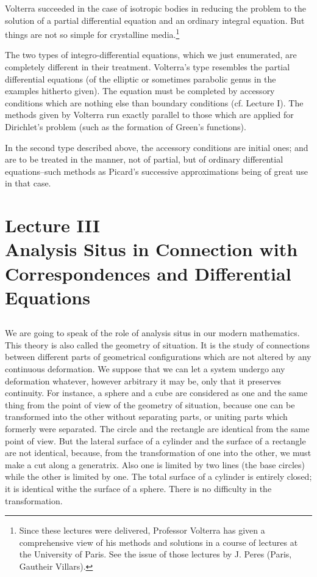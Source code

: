 \documentclass[12pt,oneside]{book}
\begin{document}
Volterra succeeded in the case of isotropic bodies in reducing the problem to
the solution of a partial differential equation and an ordinary integral
equation. But things are not so simple for crystalline media.\footnote{Since
these lectures were delivered, Professor Volterra has given a comprehensive
view of his methods and solutions in a course of lectures at the University of
Paris. See the issue of those lectures by J. Peres (Paris, Gautheir Villars).}
\par

The two types of integro-differential equations, which we just enumerated, are
completely different in their treatment. Volterra's type resembles the partial
differential equations (of the elliptic or sometimes parabolic genus in the
examples hitherto given). The equation must be completed by accessory conditions
which are nothing else than boundary conditions (cf. Lecture I). The methods
given by Volterra run exactly parallel to those which are applied for
Dirichlet's problem (such as the formation of Green's functions). \par

In the second type described above, the accessory conditions are initial ones;
and are to be treated in the manner, not of partial, but of ordinary
differential equations--such methods as Picard's successive approximations being
of great use in that case. \par

\chapter[Lecture III]{Lecture III\\Analysis Situs in Connection
with\\Correspondences and Differential Equations}

\section{}

We are going to speak of the role of analysis situs in our modern mathematics.
This theory is also called the geometry of situation. It is the study of
connections between different parts of geometrical configurations which are not
altered by any continuous deformation. We suppose that we can let a system
undergo any deformation whatever, however arbitrary it may be, only that it
preserves continuity. For instance, a sphere and a cube are considered as one and
the same thing from the point of view of the geometry of situation, because one
can be transformed into the other without separating parts, or uniting parts
which formerly were separated. The circle and the rectangle are identical from
the same point of view. But the lateral surface of a cylinder and the surface of
a rectangle are not identical, because, from the transformation of one into the
other, we must make a cut along a generatrix. Also one is limited by two lines
(the base circles) while the other is limited by one. The total surface of a
cylinder is entirely closed; it is identical withe the surface of a sphere.
There is no difficulty in the transformation. \par
\end{document}

